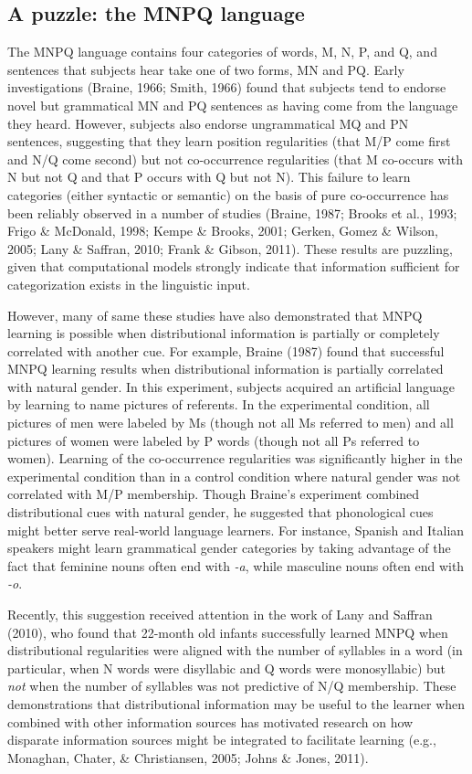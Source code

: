 \documentclass[man,floatsintext]{apa6}
\begin{document}
\subsection{A puzzle: the MNPQ language}

The MNPQ language contains four categories of words, M, N, P, and Q,
and sentences that subjects hear take one of two forms, MN and
PQ. Early investigations (Braine, 1966; Smith, 1966) found that
subjects tend to endorse novel but grammatical MN and PQ sentences as
having come from the language they heard. However, subjects also
endorse ungrammatical MQ and PN sentences, suggesting that they learn
position regularities (that M/P come first and N/Q come second) but
not co-occurrence regularities (that M co-occurs with N but not Q and
that P occurs with Q but not N). This failure to learn categories
(either syntactic or semantic) on the basis of pure co-occurrence has
been reliably observed in a number of studies (Braine, 1987; Brooks et
al., 1993; Frigo \& McDonald, 1998; Kempe \& Brooks, 2001; Gerken,
Gomez \& Wilson, 2005; Lany \& Saffran, 2010; Frank \& Gibson,
2011). These results are puzzling, given that computational models
strongly indicate that information sufficient for categorization
exists in the linguistic input.

However, many of same these studies have also demonstrated that MNPQ
learning is possible when distributional information is partially or
completely correlated with another cue. For example, Braine (1987)
found that successful MNPQ learning results when distributional
information is partially correlated with natural gender. In this
experiment, subjects acquired an artificial language by learning to
name pictures of referents. In the experimental condition, all
pictures of men were labeled by Ms (though not all Ms referred to men)
and all pictures of women were labeled by P words (though not all Ps
referred to women). Learning of the co-occurrence regularities was
significantly higher in the experimental condition than in a control
condition where natural gender was not correlated with M/P
membership. Though Braine's experiment combined distributional cues
with natural gender, he suggested that phonological cues might better
serve real-world language learners. For instance, Spanish and Italian
speakers might learn grammatical gender categories by taking advantage
of the fact that feminine nouns often end with \emph{-a}, while
masculine nouns often end with \emph{-o}.

Recently, this suggestion received attention in the work of Lany and
Saffran (2010), who found that 22-month old infants successfully
learned MNPQ when distributional regularities were aligned with the
number of syllables in a word (in particular, when N words were
disyllabic and Q words were monosyllabic) but \emph{not} when the
number of syllables was not predictive of N/Q membership. These
demonstrations that distributional information may be useful to the
learner when combined with other information sources has motivated
research on how disparate information sources might be integrated to
facilitate learning (e.g., Monaghan, Chater, \& Christiansen, 2005;
Johns \& Jones, 2011).
\end{document}
